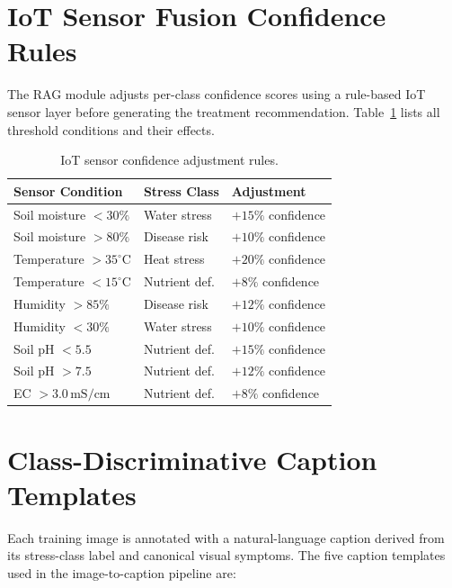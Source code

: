 \documentclass[conference]{IEEEtran}
\begin{document}
\section{IoT Sensor Fusion Confidence Rules}
\label{app:sensorfusion}

The RAG module adjusts per-class confidence scores using a rule-based IoT
sensor layer before generating the treatment recommendation.
Table~\ref{tab:sensorrules} lists all threshold conditions and their effects.

\begin{table}[!h]
\caption{IoT sensor confidence adjustment rules.}
\label{tab:sensorrules}
\centering\footnotesize
\setlength{\tabcolsep}{4pt}
\begin{tabular}{p{3.2cm}p{2.2cm}p{2.1cm}}
\toprule
\textbf{Sensor Condition} & \textbf{Stress Class} & \textbf{Adjustment}\\
\midrule
Soil moisture $<30\%$       & Water stress   & $+15\%$ confidence \\
Soil moisture $>80\%$       & Disease risk   & $+10\%$ confidence \\
Temperature $>35^\circ$C    & Heat stress    & $+20\%$ confidence \\
Temperature $<15^\circ$C    & Nutrient def.  & $+8\%$ confidence  \\
Humidity $>85\%$            & Disease risk   & $+12\%$ confidence \\
Humidity $<30\%$            & Water stress   & $+10\%$ confidence \\
Soil pH $<5.5$              & Nutrient def.  & $+15\%$ confidence \\
Soil pH $>7.5$              & Nutrient def.  & $+12\%$ confidence \\
EC $>3.0\,\text{mS/cm}$    & Nutrient def.  & $+8\%$ confidence  \\
\bottomrule
\end{tabular}
\end{table}

\section{Class-Discriminative Caption Templates}
\label{app:captions}

Each training image is annotated with a natural-language caption derived from
its stress-class label and canonical visual symptoms.
The five caption templates used in the image-to-caption pipeline are:
\end{document}
